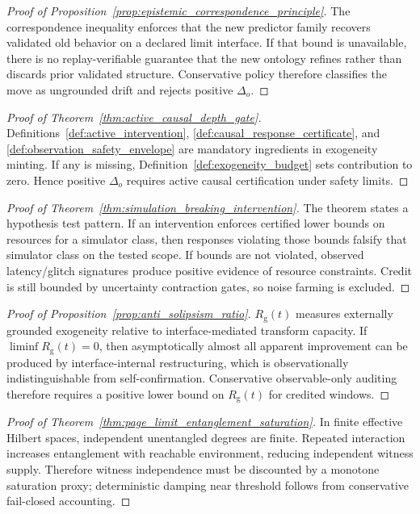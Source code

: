 \documentclass[11pt]{article}
\theoremstyle{definition}
\theoremstyle{plain}
\newcommand{\deltao}{\Delta_o}
\newcommand{\Rg}{R_{\mathrm{g}}}
\begin{document}
\begin{proof}[Proof of Proposition~\ref{prop:epistemic_correspondence_principle}]
The correspondence inequality enforces that the new predictor family recovers validated old behavior on a declared limit interface.
If that bound is unavailable, there is no replay-verifiable guarantee that the new ontology refines rather than discards prior validated structure.
Conservative policy therefore classifies the move as ungrounded drift and rejects positive $\deltao$.
\end{proof}

\begin{proof}[Proof of Theorem~\ref{thm:active_causal_depth_gate}]
Definitions~\ref{def:active_intervention}, \ref{def:causal_response_certificate}, and \ref{def:observation_safety_envelope} are mandatory ingredients in exogeneity minting.
If any is missing, Definition~\ref{def:exogeneity_budget} sets contribution to zero.
Hence positive $\deltao$ requires active causal certification under safety limits.
\end{proof}

\begin{proof}[Proof of Theorem~\ref{thm:simulation_breaking_intervention}]
The theorem states a hypothesis test pattern.
If an intervention enforces certified lower bounds on resources for a simulator class, then responses violating those bounds falsify that simulator class on the tested scope.
If bounds are not violated, observed latency/glitch signatures produce positive evidence of resource constraints.
Credit is still bounded by uncertainty contraction gates, so noise farming is excluded.
\end{proof}

\begin{proof}[Proof of Proposition~\ref{prop:anti_solipsism_ratio}]
$\Rg(t)$ measures externally grounded exogeneity relative to interface-mediated transform capacity.
If $\liminf \Rg(t)=0$, then asymptotically almost all apparent improvement can be produced by interface-internal restructuring, which is observationally indistinguishable from self-confirmation.
Conservative observable-only auditing therefore requires a positive lower bound on $\Rg(t)$ for credited windows.
\end{proof}

\begin{proof}[Proof of Theorem~\ref{thm:page_limit_entanglement_saturation}]
In finite effective Hilbert spaces, independent unentangled degrees are finite.
Repeated interaction increases entanglement with reachable environment, reducing independent witness supply.
Therefore witness independence must be discounted by a monotone saturation proxy; deterministic damping near threshold follows from conservative fail-closed accounting.
\end{proof}
\end{document}
